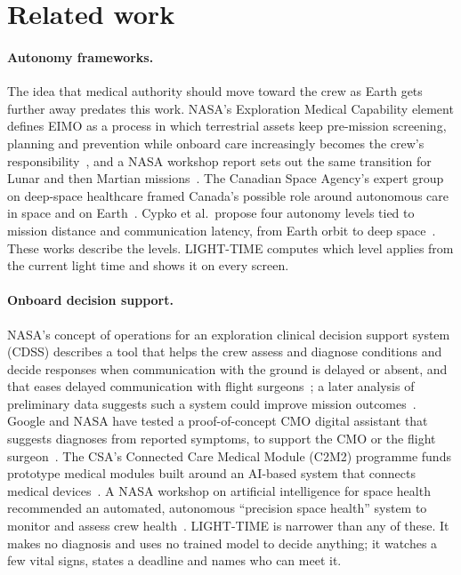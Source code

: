 \section{Related work}\label{sec:related}

\paragraph{Autonomy frameworks.}
The idea that medical authority should move toward the crew as Earth gets further away predates this work. NASA's Exploration Medical Capability element defines EIMO as a process in which terrestrial assets keep pre-mission screening, planning and prevention while onboard care increasingly becomes the crew's responsibility~\cite{levin2023eimo}, and a NASA workshop report sets out the same transition for Lunar and then Martian missions~\cite{lemery2024eimo}. The Canadian Space Agency's expert group on deep-space healthcare framed Canada's possible role around autonomous care in space and on Earth~\cite{csaDeepSpace2019}. Cypko et al.\ propose four autonomy levels tied to mission distance and communication latency, from Earth orbit to deep space~\cite{cypko2025}. These works describe the levels. LIGHT-TIME computes which level applies from the current light time and shows it on every screen.

\paragraph{Onboard decision support.}
NASA's concept of operations for an exploration clinical decision support system (CDSS) describes a tool that helps the crew assess and diagnose conditions and decide responses when communication with the ground is delayed or absent, and that eases delayed communication with flight surgeons~\cite{krihak2021cdss}; a later analysis of preliminary data suggests such a system could improve mission outcomes~\cite{russell2023cdss}. Google and NASA have tested a proof-of-concept CMO digital assistant that suggests diagnoses from reported symptoms, to support the CMO or the flight surgeon~\cite{googleCmoDa2025}. The CSA's Connected Care Medical Module (C2M2) programme funds prototype medical modules built around an AI-based system that connects medical devices~\cite{csaC2M2}. A NASA workshop on artificial intelligence for space health recommended an automated, autonomous ``precision space health'' system to monitor and assess crew health~\cite{scott2023}. LIGHT-TIME is narrower than any of these. It makes no diagnosis and uses no trained model to decide anything; it watches a few vital signs, states a deadline and names who can meet it.

